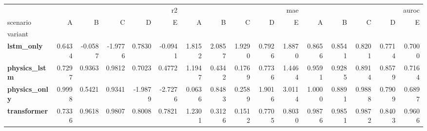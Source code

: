 \begin{tabular}{lrrrrrrrrrrrrrrr}
\toprule
 & \multicolumn{5}{r}{r2} & \multicolumn{5}{r}{mae} & \multicolumn{5}{r}{auroc} \\
scenario & A & B & C & D & E & A & B & C & D & E & A & B & C & D & E \\
variant &  &  &  &  &  &  &  &  &  &  &  &  &  &  &  \\
\midrule
\textbf{lstm_only} & 0.6434 & -0.0587 & -1.9776 & 0.7830 & -0.0941 & 1.8152 & 2.0857 & 1.9290 & 0.7926 & 1.8870 & 0.8656 & 0.8541 & 0.8201 & 0.7714 & 0.7000 \\
\textbf{physics_lstm} & 0.7297 & 0.9363 & 0.9812 & 0.7023 & 0.4772 & 1.1947 & 0.4342 & 0.1769 & 0.7736 & 1.4464 & 0.9591 & 0.9285 & 0.8914 & 0.8579 & 0.7164 \\
\textbf{physics_only} & 0.9998 & 0.5421 & 0.9341 & -1.9879 & -2.7276 & 0.0636 & 0.8483 & 0.2589 & 1.9016 & 3.0114 & 1.0000 & 0.8891 & 0.9888 & 0.7909 & 0.6897 \\
\textbf{transformer} & 0.7336 & 0.9618 & 0.9807 & 0.8008 & 0.7821 & 1.2301 & 0.3126 & 0.1512 & 0.7705 & 0.8030 & 0.9876 & 0.9851 & 0.9872 & 0.8403 & 0.9606 \\
\bottomrule
\end{tabular}
